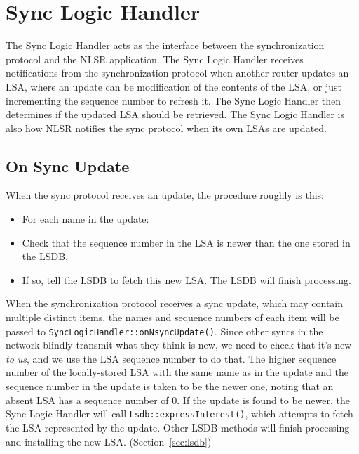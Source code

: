 \section{Sync Logic Handler}
\label{sec:sync-logic}

The Sync Logic Handler acts as the interface between the synchronization protocol and the NLSR application.
The Sync Logic Handler receives notifications from the synchronization protocol when another router updates an LSA, where an update can be modification of the contents of the LSA, or just incrementing the sequence number to refresh it. The  Sync Logic Handler then determines if the updated LSA should be retrieved. The Sync Logic Handler is also how NLSR notifies the sync protocol when its own LSAs are updated.

\subsection{On Sync Update}
When the sync protocol receives an update, the procedure roughly is this:
\begin{itemize}
\item For each name in the update:
\item Check that the sequence number in the LSA is newer than the one stored in the LSDB.
\item If so, tell the LSDB to fetch this new LSA. The LSDB will finish processing.
\end{itemize}

When the synchronization protocol receives a sync update, which may contain multiple distinct items, the names and sequence numbers of each item will be passed to \texttt{SyncLogicHandler::onNsyncUpdate()}.
Since other syncs in the network blindly transmit what they think is new, we need to check that it's new \emph{to us}, and we use the LSA sequence number to do that. The higher sequence number of the locally-stored LSA with the same name as in the update and the sequence number in the update is taken to be the newer one, noting that an absent LSA has a sequence number of 0.
If the update is found to be newer, the Sync Logic Handler will call \texttt{Lsdb::expressInterest()}, which attempts to fetch the LSA represented by the update. Other LSDB methods will finish processing and installing the new LSA. (Section~\ref{sec:lsdb})

